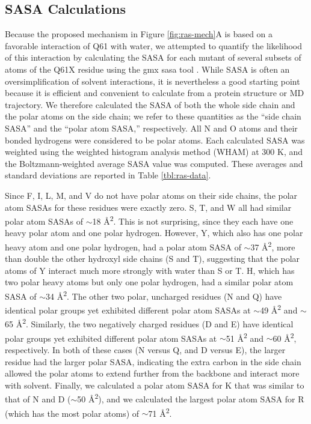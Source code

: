 \subsection{SASA Calculations}

Because the proposed mechanism in Figure \ref{fig:ras-mech}A is based on a favorable interaction of Q61 with water, we attempted to quantify the likelihood of this interaction by calculating the SASA for each mutant of several subsets of atoms of the Q61X residue using the gmx sasa tool \cite{Eisenhaber1995}.
While SASA is often an oversimplification of solvent interactions, it is nevertheless a good starting point because it is efficient and convenient to calculate from a protein structure or MD trajectory. 
We therefore calculated the SASA of both the whole side chain and the polar atoms on the side chain; we refer to these quantities as the ``side chain SASA'' and the ``polar atom SASA,'' respectively. 
All N and O atoms and their bonded hydrogens were considered to be polar atoms. 
Each calculated SASA was weighted using the weighted histogram analysis method (WHAM) at 300 K, and the Boltzmann-weighted average SASA value was computed. 
These averages and standard deviations are reported in Table \ref{tbl:ras-data}.

Since F, I, L, M, and V do not have polar atoms on their side chains, the polar atom SASAs for these residues were exactly zero. 
S, T, and W all had similar polar atom SASAs of $\sim$18 \si{\angstrom^2}. 
This is not surprising, since they each have one heavy polar atom and one polar hydrogen. 
However, Y, which also has one polar heavy atom and one polar hydrogen, had a polar atom SASA of $\sim$37 \si{\angstrom^2}, more than double the other hydroxyl side chains (S and T), suggesting that the polar atoms of Y interact much more strongly with water than S or T. 
H, which has two polar heavy atoms but only one polar hydrogen, had a similar polar atom SASA of $\sim$34 \si{\angstrom^2}. 
The other two polar, uncharged residues (N and Q) have identical polar groups yet exhibited different polar atom SASAs at $\sim$49 \si{\angstrom^2} and $\sim$65 \si{\angstrom^2}. 
Similarly, the two negatively charged residues (D and E) have identical polar groups yet exhibited different polar atom SASAs at $\sim$51 \si{\angstrom^2} and $\sim$60 \si{\angstrom^2}, respectively. 
In both of these cases (N versus Q, and D versus E), the larger residue had the larger polar SASA, indicating the extra carbon in the side chain allowed the polar atoms to extend further from the backbone and interact more with solvent. 
Finally, we calculated a polar atom SASA for K that was similar to that of N and D ($\sim$50 \si{\angstrom^2}), and we calculated the largest polar atom SASA for R (which has the most polar atoms) of $\sim$71 \si{\angstrom^2}.

